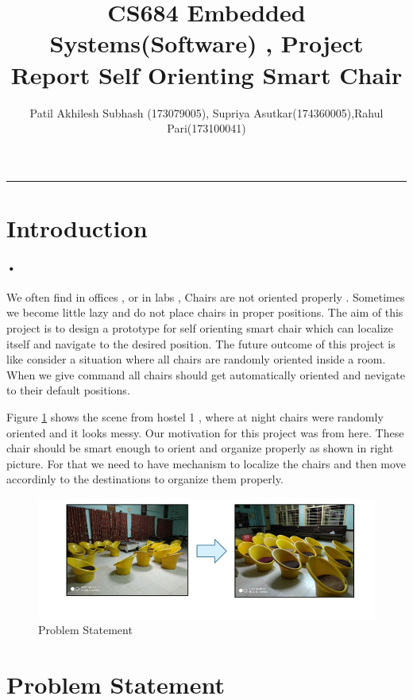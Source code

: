 \documentclass[]{exam}
\title{\centering CS684 Embedded Systems(Software) , Project Report \newline \centering Self Orienting Smart Chair}
\author{Patil Akhilesh Subhash (173079005), Supriya Asutkar(174360005),Rahul Pari(173100041)}
\begin{document}
\maketitle

\hrule

\tableofcontents
{}

\newpage 
\section{\color{red} Introduction }
\paragraph{•}
We often find in offices , or in labs , Chairs are not oriented properly . Sometimes we become little lazy and do not place chairs in proper positions. The aim of this project is to design a prototype for self orienting smart chair which can localize itself and navigate to the desired position. The future outcome of this project is like consider a situation where all chairs are randomly oriented inside a room. When we give command all chairs should get automatically oriented and nevigate to their default positions.

Figure \ref{intro}  shows the scene from hostel 1 , where at night chairs were randomly oriented and it looks messy. Our motivation for this project was from here. These chair should  be smart enough to orient and organize properly as shown in right picture. For that we need to have mechanism to localize the chairs and then move accordinly to the destinations to organize them properly. 
\begin{figure}[h!]


 \centering
 
  \includegraphics[scale=0.5]{intro.png}
  \caption{Problem Statement }
  \label{intro}
  \end{figure}
    

\section{\color{red} Problem Statement }
\end{document}
